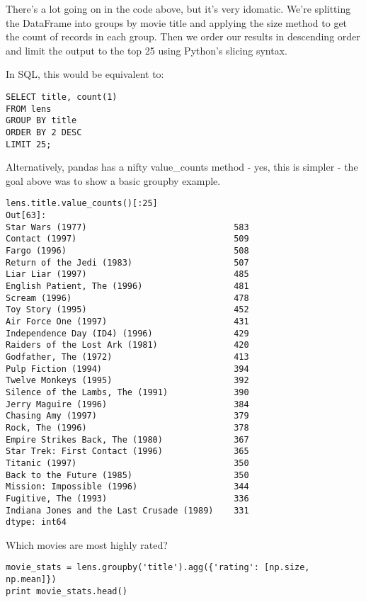 There's a lot going on in the code above, but it's very idomatic. We're splitting the DataFrame into groups by movie title and applying the size method to get the count of records in each group. Then we order our results in descending order and limit the output to the top 25 using Python's slicing syntax.

In SQL, this would be equivalent to:

\begin{framed}
\begin{verbatim}
SELECT title, count(1)
FROM lens
GROUP BY title
ORDER BY 2 DESC
LIMIT 25;
\end{verbatim}

Alternatively, pandas has a nifty value_counts method - yes, this is simpler - the goal above was to show a basic groupby example.

\begin{verbatim}
lens.title.value_counts()[:25]
Out[63]:
Star Wars (1977)                             583
Contact (1997)                               509
Fargo (1996)                                 508
Return of the Jedi (1983)                    507
Liar Liar (1997)                             485
English Patient, The (1996)                  481
Scream (1996)                                478
Toy Story (1995)                             452
Air Force One (1997)                         431
Independence Day (ID4) (1996)                429
Raiders of the Lost Ark (1981)               420
Godfather, The (1972)                        413
Pulp Fiction (1994)                          394
Twelve Monkeys (1995)                        392
Silence of the Lambs, The (1991)             390
Jerry Maguire (1996)                         384
Chasing Amy (1997)                           379
Rock, The (1996)                             378
Empire Strikes Back, The (1980)              367
Star Trek: First Contact (1996)              365
Titanic (1997)                               350
Back to the Future (1985)                    350
Mission: Impossible (1996)                   344
Fugitive, The (1993)                         336
Indiana Jones and the Last Crusade (1989)    331
dtype: int64
\end{verbatim}
Which movies are most highly rated?


\begin{framed}
\begin{verbatim}
movie_stats = lens.groupby('title').agg({'rating': [np.size, np.mean]})
print movie_stats.head()
\end{verbatim}


\end{framed}
\end{framed}
